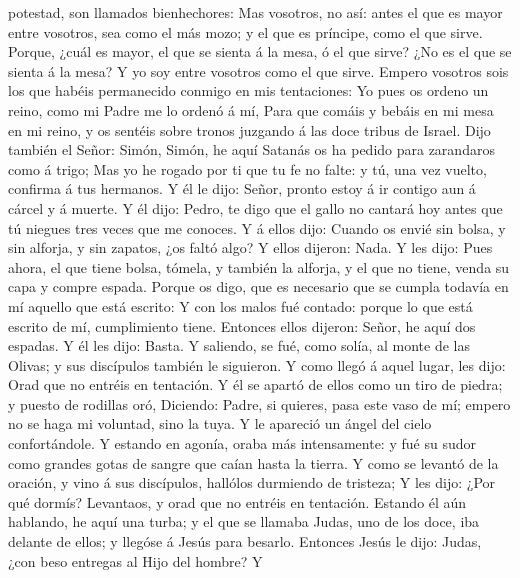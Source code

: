 potestad, son llamados bienhechores:  Mas vosotros, no
así: antes el que es mayor entre vosotros, sea como el más mozo; y el
que es príncipe, como el que sirve.  Porque, ¿cuál es
mayor, el que se sienta á la mesa, ó el que sirve? ¿No es el que se
sienta á la mesa? Y yo soy entre vosotros como el que sirve.
 Empero vosotros sois los que habéis permanecido conmigo
en mis tentaciones:  Yo pues os ordeno un reino, como mi
Padre me lo ordenó á mí,  Para que comáis y bebáis en mi
mesa en mi reino, y os sentéis sobre tronos juzgando á las doce tribus
de Israel.  Dijo también el Señor: Simón, Simón, he aquí
Satanás os ha pedido para zarandaros como á trigo;  Mas
yo he rogado por ti que tu fe no falte: y tú, una vez vuelto, confirma á
tus hermanos.  Y él le dijo: Señor, pronto estoy á ir
contigo aun á cárcel y á muerte.  Y él dijo: Pedro, te
digo que el gallo no cantará hoy antes que tú niegues tres veces que me
conoces.  Y á ellos dijo: Cuando os envié sin bolsa, y
sin alforja, y sin zapatos, ¿os faltó algo? Y ellos dijeron: Nada.
 Y les dijo: Pues ahora, el que tiene bolsa, tómela, y
también la alforja, y el que no tiene, venda su capa y compre espada.
 Porque os digo, que es necesario que se cumpla todavía
en mí aquello que está escrito: Y con los malos fué contado: porque lo
que está escrito de mí, cumplimiento tiene.  Entonces
ellos dijeron: Señor, he aquí dos espadas. Y él les dijo: Basta.
 Y saliendo, se fué, como solía, al monte de las Olivas;
y sus discípulos también le siguieron.  Y como llegó á
aquel lugar, les dijo: Orad que no entréis en tentación. 
Y él se apartó de ellos como un tiro de piedra; y puesto de rodillas
oró,  Diciendo: Padre, si quieres, pasa este vaso de mí;
empero no se haga mi voluntad, sino la tuya.  Y le
apareció un ángel del cielo confortándole.  Y estando en
agonía, oraba más intensamente: y fué su sudor como grandes gotas de
sangre que caían hasta la tierra.  Y como se levantó de
la oración, y vino á sus discípulos, hallólos durmiendo de tristeza;
 Y les dijo: ¿Por qué dormís? Levantaos, y orad que no
entréis en tentación.  Estando él aún hablando, he aquí
una turba; y el que se llamaba Judas, uno de los doce, iba delante de
ellos; y llegóse á Jesús para besarlo.  Entonces Jesús le
dijo: Judas, ¿con beso entregas al Hijo del hombre?  Y
